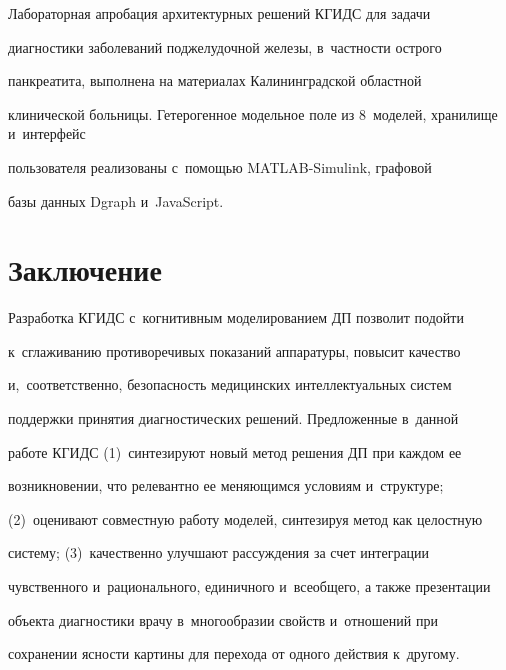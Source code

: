   

  Лабораторная апробация архитектурных решений КГИДС для задачи 

диагностики заболеваний поджелудочной железы, в~част\-ности острого 

панкреатита, выполнена на материалах Калининградской областной 

клинической больницы. Гетерогенное модельное поле из 8~моделей, хранилище и~интерфейс 

пользователя реализованы с~по\-мощью \mbox{MATLAB}-Simulink, графовой 

базы данных \mbox{Dgraph} и~\mbox{JavaScript.}



\vspace*{-4pt}



\section{Заключение}



\vspace*{-2pt}



  Разработка КГИДС с~когнитивным моделированием ДП позволит подойти 

к~сглаживанию противоречивых показаний аппаратуры, повысит качество 

и,~соответственно, безопасность медицинских интеллектуальных систем 

поддержки принятия диагностических решений. Предложенные в~данной 

работе КГИДС (1)~синтезируют новый метод решения ДП при каждом ее 

возникновении, что релевантно ее меняющимся условиям и~структуре; 

(2)~оценивают совместную работу моделей, синтезируя метод как целостную 

систему; (3)~качественно улучшают рассуждения за счет интеграции 

чувственного и~рационального, единичного и~всеобщего, а также презентации 

объекта диагностики врачу в~многообразии свойств и~отношений при 

сохранении ясности картины для перехода от одного действия к~другому.



\vspace*{-4pt}

